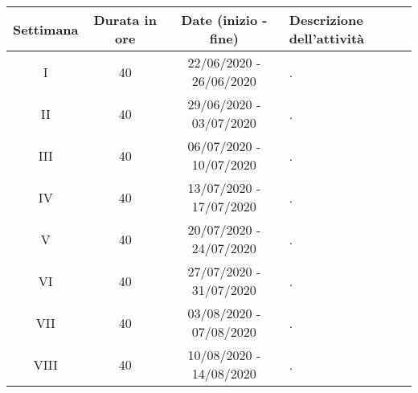 

\begin{tabularx}{\textwidth}{|c|c|c|X|}
	\hline
	\textbf{Settimana} & \textbf{Durata in ore} & \textbf{Date (inizio - fine)} & \textbf{Descrizione dell'attività} \\\hline
	
	I & 40 & 22/06/2020 - 26/06/2020 & . \\
	\hline
    II & 40 & 29/06/2020 - 03/07/2020 & . \\
    \hline
    III & 40 & 06/07/2020 - 10/07/2020 & . \\
    \hline
    IV & 40 & 13/07/2020 - 17/07/2020 & . \\
    \hline
    V & 40 & 20/07/2020 - 24/07/2020 & . \\
    \hline
    VI & 40 & 27/07/2020 - 31/07/2020 & . \\
    \hline
    VII & 40 & 03/08/2020 - 07/08/2020 & . \\
    \hline
    VIII & 40 & 10/08/2020 - 14/08/2020 & . \\	
    \hline
\end{tabularx}
